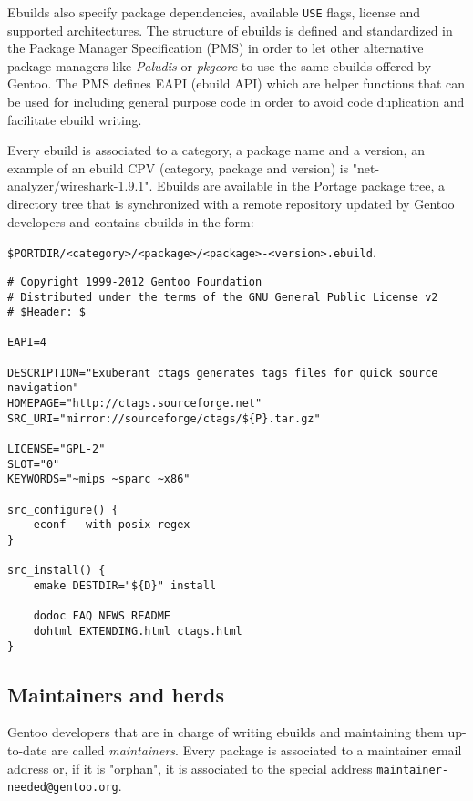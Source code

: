 Ebuilds also specify package dependencies, available \texttt{USE} flags, license and supported architectures.
The structure of ebuilds is defined and standardized in the Package Manager Specification (PMS) \cite{gentoo_pms} in order to let other alternative package managers like \emph{Paludis} or \emph{pkgcore} to use the same ebuilds offered by Gentoo. The PMS defines EAPI (ebuild API) which are helper functions that can be used for including general purpose code in order to avoid code duplication and facilitate ebuild writing.

Every ebuild is associated to a category, a package name and a version, an example of an ebuild CPV (category, package and version) is "net-analyzer/wireshark-1.9.1".
Ebuilds are available in the Portage package tree, a directory tree that is synchronized with a remote repository updated by Gentoo developers and contains ebuilds in the form:

\texttt{\$PORTDIR/<category>/<package>/<package>-<version>.ebuild}.


\vspace{0.5cm}
\lstset{language=bash, caption=Simplified ebuild for "Exuberant ctags", label=Example of an ebuild, numbers=left, stepnumber=2, frame=single, breaklines=true}
\begin{lstlisting}
# Copyright 1999-2012 Gentoo Foundation
# Distributed under the terms of the GNU General Public License v2
# $Header: $

EAPI=4

DESCRIPTION="Exuberant ctags generates tags files for quick source navigation"
HOMEPAGE="http://ctags.sourceforge.net"
SRC_URI="mirror://sourceforge/ctags/${P}.tar.gz"

LICENSE="GPL-2"
SLOT="0"
KEYWORDS="~mips ~sparc ~x86"

src_configure() {
    econf --with-posix-regex
}

src_install() {
    emake DESTDIR="${D}" install

    dodoc FAQ NEWS README
    dohtml EXTENDING.html ctags.html
}
\end{lstlisting}
\vspace{0.5cm}


\subsection{Maintainers and herds}
Gentoo developers that are in charge of writing ebuilds and maintaining them up-to-date are called \emph{maintainers}. Every package is associated to a maintainer email address or, if it is "orphan", it is associated to the special address \texttt{maintainer-needed@gentoo.org}.

